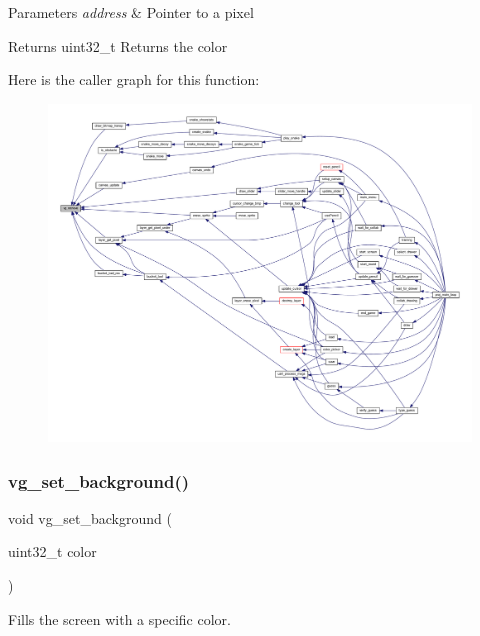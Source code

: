 \begin{DoxyParams}{Parameters}
{\em address} & Pointer to a pixel \\
\hline
\end{DoxyParams}
\begin{DoxyReturn}{Returns}
uint32\+\_\+t Returns the color 
\end{DoxyReturn}
Here is the caller graph for this function\+:\nopagebreak
\begin{figure}[H]
\begin{center}
\leavevmode
\includegraphics[width=350pt]{group__video_ga8ff5bbb05f1cb62f5958290a45723571_icgraph}
\end{center}
\end{figure}
\mbox{\label{group__video_ga6e2c7948df1662b15b1977cf20e8e479}} 
\subsubsection{\texorpdfstring{vg\+\_\+set\+\_\+background()}{vg\_set\_background()}}
{\footnotesize\ttfamily void vg\+\_\+set\+\_\+background (\begin{DoxyParamCaption}\item[{uint32\+\_\+t}]{color }\end{DoxyParamCaption})}



Fills the screen with a specific color. 


